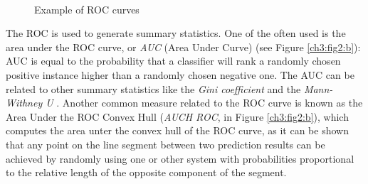 \begin{figure}[!hbt]
  \centering
    \\
    \caption{Example of ROC curves}
    \label{ch3:fig2}
\end{figure}


The \Gls{ROC} is used to generate summary statistics. One of the often used is the area under the \Gls{ROC} curve, or \textit{AUC} (Area Under Curve)\cite{Brown200624, ROC02} (see Figure \ref{ch3:fig2:b}):
AUC is equal to the probability that a classifier will rank a randomly chosen positive instance higher than a randomly chosen negative one. The AUC can be related to other
summary statistics like the \textit{Gini coefficient} \cite{Gini} and the \textit{Mann-Withney U} \cite{MWU}.
Another common measure related to the \Gls{ROC} curve is known as the Area Under the ROC Convex Hull (\textit{AUCH ROC}, in Figure \ref{ch3:fig2:b}), which computes the area unter the convex hull of the ROC curve, as
it can be shown that any point on the line segment between two prediction results can be achieved by randomly using one or other system with probabilities proportional to the relative length of the opposite component of the segment.














